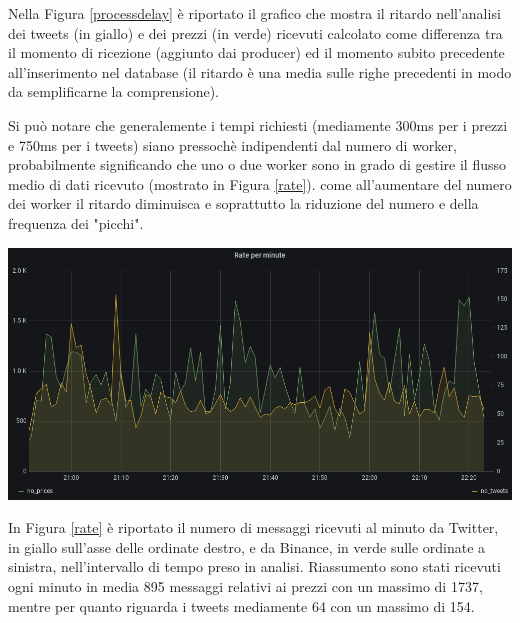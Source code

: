 Nella Figura \ref{processdelay} è riportato il grafico che mostra il ritardo nell'analisi dei tweets
(in giallo) e dei prezzi (in verde) ricevuti calcolato come differenza tra il momento di ricezione
(aggiunto dai producer) ed il momento subito precedente all'inserimento nel database (il ritardo è
una media sulle righe precedenti in modo da semplificarne la comprensione).

Si può notare che generalemente i tempi richiesti (mediamente 300ms per i prezzi e 750ms per
i tweets) siano pressochè indipendenti dal numero di worker,
probabilmente significando che uno o due worker sono in grado di gestire il flusso medio di dati
ricevuto (mostrato in Figura \ref{rate}).
come all'aumentare del numero dei worker il ritardo diminuisca e soprattutto la
riduzione del numero e della frequenza dei "picchi".

\begin{center}
    \includegraphics[max width=\linewidth]{rate.png}
    \label{rate}
\end{center}

In Figura \ref{rate} è riportato il numero di messaggi ricevuti al minuto da Twitter, in giallo
sull'asse delle ordinate destro, e da Binance, in verde sulle ordinate a sinistra, nell'intervallo
di tempo preso in analisi.
Riassumento sono stati ricevuti ogni minuto in media 895 messaggi relativi ai prezzi con un
massimo di 1737, mentre per quanto riguarda i tweets mediamente 64 con un massimo di 154. 

